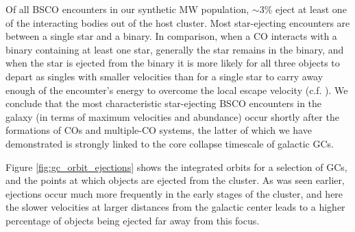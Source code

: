 \documentclass[twocolumn]{aastex631}
\begin{document}

Of all BSCO encounters in our synthetic MW population, $\sim3\%$ eject at least one of the interacting bodies out of the host cluster.
Most star-ejecting encounters are between a single star and a binary.
In comparison, when a CO interacts with a binary containing at least one star, generally the star remains in the binary, and when the star is ejected from the binary it is more likely for all three objects to depart as singles with smaller velocities than for a single star to carry away enough of the encounter's energy to overcome the local escape velocity (c.f. \citet{1983ApJ...268..319H}).
We conclude that the most characteristic star-ejecting BSCO encounters in the galaxy (in terms of maximum velocities and abundance) occur shortly after the formations of COs and multiple-CO systems, the latter of which we have demonstrated is strongly linked to the core collapse timescale of galactic GCs.

Figure \ref{fig:gc_orbit_ejections} shows the integrated orbits for a selection of GCs, and the points at which objects are ejected from the cluster.
As was seen earlier, ejections occur much more frequently in the early stages of the cluster, and here the slower velocities at larger distances from the galactic center leads to a higher percentage of objects being ejected far away from this focus.

\begin{figure*}
    \caption{
        Plots showing the back-integrated orbits for some MW GCs, and the points in the orbit where an object is ejected from the GC.
        The color scale of the points indicates the time of ejection, measured backward from the present day; from the partial monochromism of the data and the density of points for portions of the orbit it can be seen how the ejections are more concentrated earlier in the cluster's evolution and farther away from the galactic center.
    }
    \label{fig:gc_orbit_ejections}
\end{figure*}
\end{document}
